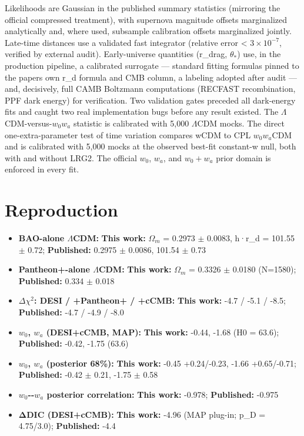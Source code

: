\documentclass[aps,prd,preprint,superscriptaddress,nofootinbib]{revtex4-2}
\providecommand{\tightlist}{\setlength{\itemsep}{0pt}\setlength{\parskip}{0pt}}
\begin{document}
Likelihoods are Gaussian in the published summary statistics (mirroring
the official compressed treatment), with supernova magnitude offsets
marginalized analytically and, where used, subsample calibration offsets
marginalized jointly. Late-time distances use a validated fast
integrator (relative error \textless{} \(3\times 10^{-7}\), verified by
external audit). Early-universe quantities (r\_drag, \(\theta_*\)) use,
in the production pipeline, a calibrated surrogate --- standard fitting
formulas pinned to the paper\textquotesingle s own r\_d formula and CMB
column, a labeling adopted after audit --- and, decisively, full CAMB
Boltzmann computations (RECFAST recombination, PPF dark energy) for
verification. Two validation gates preceded all dark-energy fits and
caught two real implementation bugs before any result existed. The
\(\Lambda\)CDM-versus-\(w_0\)\(w_a\) statistic is calibrated with 5,000
\(\Lambda\)CDM mocks. The direct one-extra-parameter test of time
variation compares wCDM to CPL \(w_0w_a\)CDM and is calibrated with
5,000 mocks at the observed best-fit constant-w null, both with and
without LRG2. The official \(w_0\), \(w_a\), and \(w_0+w_a\) prior
domain is enforced in every fit.

\section{Reproduction}\label{reproduction}

\begin{itemize}
\tightlist
\item
  \textbf{BAO-alone \(\Lambda\)CDM:} \textbf{This work:} \(\Omega_m\) =
  0.2973 \(\pm\) 0.0083, h·r\_d = 101.55 \(\pm\) 0.72;
  \textbf{Published:} 0.2975 \(\pm\) 0.0086, 101.54 \(\pm\) 0.73
\item
  \textbf{Pantheon+-alone \(\Lambda\)CDM:} \textbf{This work:}
  \(\Omega_m\) = 0.3326 \(\pm\) 0.0180 (N=1580); \textbf{Published:}
  0.334 \(\pm\) 0.018
\item
  \textbf{\(\Delta\chi^2\): DESI / +Pantheon+ / +cCMB:} \textbf{This
  work:} -4.7 / -5.1 / -8.5; \textbf{Published:} -4.7 / -4.9 / -8.0
\item
  \textbf{\(w_0\), \(w_a\) (DESI+cCMB, MAP):} \textbf{This work:} -0.44,
  -1.68 (H0 = 63.6); \textbf{Published:} -0.42, -1.75 (63.6)
\item
  \textbf{\(w_0\), \(w_a\) (posterior 68\%):} \textbf{This work:} -0.45
  +0.24/-0.23, -1.66 +0.65/-0.71; \textbf{Published:} -0.42 \(\pm\)
  0.21, -1.75 \(\pm\) 0.58
\item
  \textbf{\(w_0\)-\/-\(w_a\) posterior correlation:} \textbf{This work:}
  -0.978; \textbf{Published:} -0.975
\item
  \textbf{ΔDIC (DESI+cCMB):} \textbf{This work:} -4.96 (MAP plug-in;
  p\_D = 4.75/3.0); \textbf{Published:} -4.4
\end{itemize}
\end{document}

